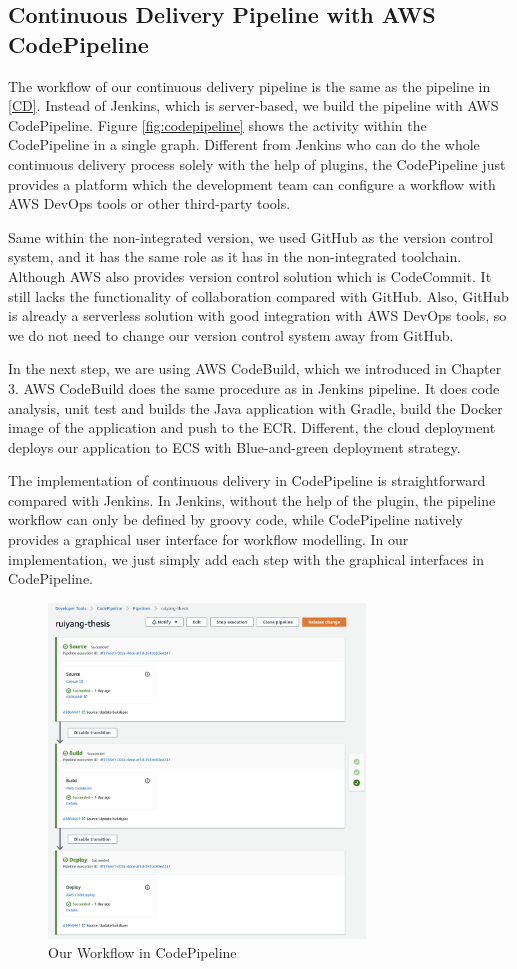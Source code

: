 \subsection{Continuous Delivery Pipeline with AWS CodePipeline}
The workflow of our continuous delivery pipeline is the same as the pipeline in \ref{CD}. Instead of Jenkins, which is server-based, we build the pipeline with AWS CodePipeline. Figure \ref{fig:codepipeline} shows the activity within the CodePipeline in a single graph. Different from Jenkins who can do the whole continuous delivery process solely with the help of plugins, the CodePipeline just provides a platform which the development team can configure a workflow with AWS DevOps tools or other third-party tools. 
\par
Same within the non-integrated version, we used GitHub as the version control system, and it has the same role as it has in the non-integrated toolchain. Although AWS also provides version control solution which is CodeCommit. It still lacks the functionality of collaboration compared with GitHub. Also, GitHub is already a serverless solution with good integration with AWS DevOps tools, so we do not need to change our version control system away from GitHub. 
\par
In the next step, we are using AWS CodeBuild, which we introduced in Chapter 3. AWS CodeBuild does the same procedure as in Jenkins pipeline. It does code analysis, unit test and builds the Java application with Gradle, build the Docker image of the application and push to the ECR. Different, the cloud deployment deploys our application to ECS with Blue-and-green deployment strategy.
\par
The implementation of continuous delivery in CodePipeline is straightforward compared with Jenkins. In Jenkins, without the help of the plugin, the pipeline workflow can only be defined by groovy code, while CodePipeline natively provides a graphical user interface for workflow modelling. In our implementation, we just simply add each step with the graphical interfaces in CodePipeline.
\begin{figure}[h]
 \centering
 \includegraphics[width=0.75\textwidth]{pics/cp-interface.png}
 \caption{Our Workflow in CodePipeline}
 \label{fig:cp-edit}
\end{figure}
